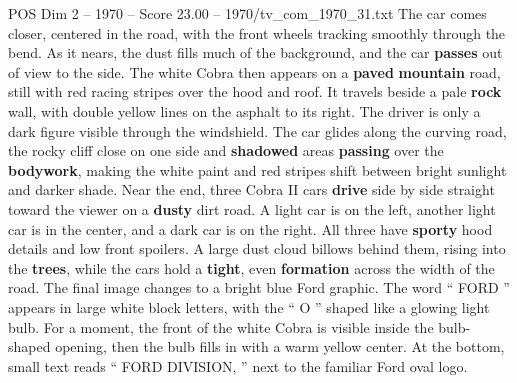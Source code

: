 \begin{textsample}{POS Dim 2 – 1970 – Score 23.00 – 1970/tv\_com\_1970\_31.txt}
The car comes closer, centered in the road, with the front wheels tracking smoothly through the bend.
As it nears, the dust fills much of the background, and the car \textbf{passes} out of view to the side.
The white Cobra then appears on a \textbf{paved} \textbf{mountain} road, still with red racing stripes over the hood and roof.
It travels beside a pale \textbf{rock} wall, with double yellow lines on the asphalt to its right.
The driver is only a dark figure visible through the windshield.
The car glides along the curving road, the rocky cliff close on one side and \textbf{shadowed} areas \textbf{passing} over the \textbf{bodywork}, making the white paint and red stripes shift between bright sunlight and darker shade.
Near the end, three Cobra II cars \textbf{drive} side by side straight toward the viewer on a \textbf{dusty} dirt road.
A light car is on the left, another light car is in the center, and a dark car is on the right.
All three have \textbf{sporty} hood details and low front spoilers.
A large dust cloud billows behind them, rising into the \textbf{trees}, while the cars hold a \textbf{tight}, even \textbf{formation} across the width of the road.
The final image changes to a bright blue Ford graphic.
The word “ FORD ” appears in large white block letters, with the “ O ” shaped like a glowing light bulb.
For a moment, the front of the white Cobra is visible inside the bulb-shaped opening, then the bulb fills in with a warm yellow center.
At the bottom, small text reads “ FORD DIVISION, ” next to the familiar Ford oval logo.

\end{textsample}
